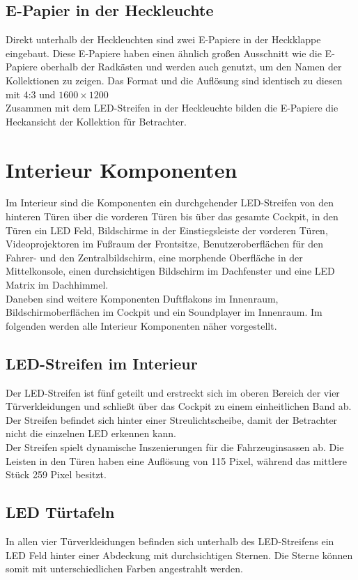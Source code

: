 \subsection{E-Papier in der Heckleuchte}
Direkt unterhalb der Heckleuchten sind zwei E-Papiere in der Heckklappe eingebaut.
Diese E-Papiere haben einen ähnlich großen Ausschnitt wie die E-Papiere oberhalb der Radkästen und werden auch genutzt, um den Namen der Kollektionen zu zeigen. Das Format und die Auflösung sind identisch zu diesen mit 4:3 und $ 1600\times1200 $\\
Zusammen mit dem LED-Streifen in der Heckleuchte bilden die E-Papiere die Heckansicht der Kollektion für Betrachter.
\section{Interieur Komponenten}
Im Interieur sind die Komponenten ein durchgehender LED-Streifen von den hinteren Türen über die vorderen Türen bis über das gesamte Cockpit, in den Türen ein LED Feld, Bildschirme in der Einstiegsleiste der vorderen Türen, Videoprojektoren im Fußraum der Frontsitze, Benutzeroberflächen für den Fahrer- und den Zentralbildschirm, eine morphende Oberfläche in der Mittelkonsole, einen durchsichtigen Bildschirm im Dachfenster und eine LED Matrix im Dachhimmel.\\
Daneben sind weitere Komponenten Duftflakons im Innenraum, Bildschirmoberflächen im Cockpit und ein Soundplayer im Innenraum.
Im folgenden werden alle Interieur Komponenten näher vorgestellt.
\subsection{LED-Streifen im Interieur}
Der LED-Streifen ist fünf geteilt und erstreckt sich im oberen Bereich der vier Türverkleidungen und schließt über das Cockpit zu einem einheitlichen Band ab. Der Streifen befindet sich hinter einer Streulichtscheibe, damit der Betrachter nicht die einzelnen LED erkennen kann. \\
Der Streifen spielt dynamische Inszenierungen für die Fahrzeuginsassen ab.
Die Leisten in den Türen haben eine Auflösung von 115 Pixel, während das mittlere Stück 259 Pixel besitzt.
\subsection{LED Türtafeln}
In allen vier Türverkleidungen befinden sich unterhalb des LED-Streifens ein LED Feld hinter einer Abdeckung mit durchsichtigen Sternen. Die Sterne können somit mit unterschiedlichen Farben angestrahlt werden.\\

